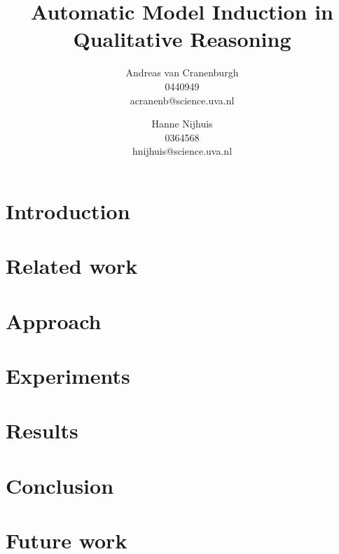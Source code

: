 \documentclass{article}
\title{Automatic Model Induction in Qualitative Reasoning}
\author{Andreas van Cranenburgh \\ 0440949 \\ acranenb@science.uva.nl \and Hanne Nijhuis \\ 0364568 \\ hnijhuis@science.uva.nl}
\begin{document}
\maketitle

\begin{abstract}
\end{abstract}

\section{Introduction}

\section{Related work}

\section{Approach}

\section{Experiments}

\section{Results}

\section{Conclusion}

\section{Future work}

\begin{thebibliography}{99}
\bibitem{}
\end{thebibliography}
\end{document}
